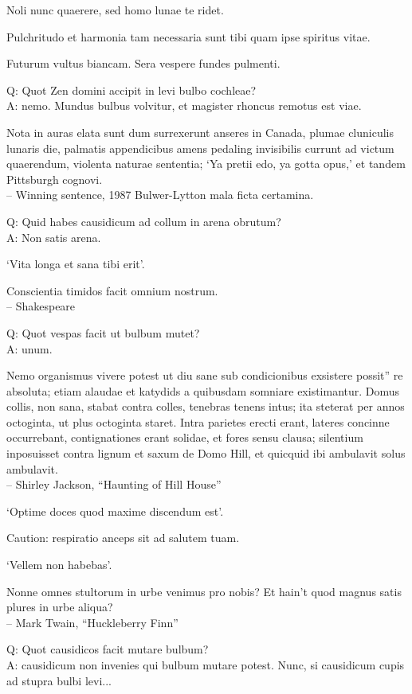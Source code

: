 \documentclass[titlepage,12pt]{memoir}
\begin{document}
Noli nunc quaerere, sed homo lunae te ridet.

 Pulchritudo et harmonia tam necessaria sunt tibi quam ipse spiritus vitae.

Futurum vultus biancam. Sera vespere fundes pulmenti.

Q: Quot Zen domini accipit in levi bulbo cochleae?\\
A: nemo. Mundus bulbus volvitur, et magister rhoncus remotus est
viae.

Nota in auras elata sunt dum surrexerunt anseres in Canada, plumae
cluniculis lunaris die, palmatis appendicibus amens pedaling invisibilis
currunt ad victum quaerendum, violenta naturae sententia;
‘Ya pretii edo, ya gotta opus,’ et tandem Pittsburgh cognovi.
\\-- Winning sentence, 1987 Bulwer-Lytton mala ficta certamina.

Q: Quid habes causidicum ad collum in arena obrutum?\\
A: Non satis arena.

‘Vita longa et sana tibi erit’.

Conscientia timidos facit omnium nostrum.
\\-- Shakespeare

Q: Quot vespas facit ut bulbum mutet?\\
A: unum.

Nemo organismus vivere potest ut diu sane sub condicionibus exsistere possit”
re absoluta; etiam alaudae et katydids a quibusdam somniare existimantur.
Domus collis, non sana, stabat contra colles, tenebras tenens
intus; ita steterat per annos octoginta, ut plus octoginta staret.
Intra parietes erecti erant, lateres concinne occurrebant, contignationes erant solidae, et
fores sensu clausa; silentium inposuisset contra lignum et saxum
de Domo Hill, et quicquid ibi ambulavit solus ambulavit.
\\-- Shirley Jackson, “Haunting of Hill House”

‘Optime doces quod maxime discendum est’.

Caution: respiratio anceps sit ad salutem tuam.

‘Vellem non habebas’.

Nonne omnes stultorum in urbe venimus pro nobis? Et hain’t quod magnus
satis plures in urbe aliqua?
\\-- Mark Twain, “Huckleberry Finn”

Q: Quot causidicos facit mutare bulbum?\\
A: causidicum non invenies qui bulbum mutare potest. Nunc, si
causidicum cupis ad stupra bulbi levi...
\end{document}
